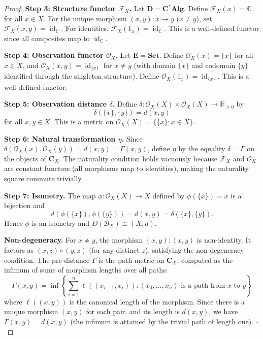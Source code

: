 \documentclass[11pt,a4paper]{article}
\begin{document}
\begin{proof}
\noindent\textbf{Step 3: Structure functor $\mathcal{F}_X$.}
Let $\mathbf{D}=\mathbf{C^*Alg}$. Define $\mathcal{F}_X(x)=\mathbb{C}$ for
all $x\in X$. For the unique morphism $(x,y):x\to y$ ($x\neq y$), set
$\mathcal{F}_X(x,y)=\operatorname{id}_{\mathbb{C}}$. For identities,
$\mathcal{F}_X(1_x)=\operatorname{id}_{\mathbb{C}}$. This is a well-defined
functor since all composites map to $\operatorname{id}_{\mathbb{C}}$.

\noindent\textbf{Step 4: Observation functor $\mathcal{O}_X$.}
Let $\mathbf{E}=\mathbf{Set}$. Define $\mathcal{O}_X(x)=\{x\}$ for all
$x\in X$, and $\mathcal{O}_X(x,y)=\operatorname{id}_{\{x\}}$ for $x\neq y$
(with domain $\{x\}$ and codomain $\{y\}$ identified through the singleton
structure). Define $\mathcal{O}_X(1_x)=\operatorname{id}_{\{x\}}$. This is
a well-defined functor.

\noindent\textbf{Step 5: Observation distance $\delta$.}
Define $\delta:\mathcal{O}_X(X)\times\mathcal{O}_X(X)\to\mathbb{R}_{\geq 0}$ by
\begin{equation}
\delta(\{x\},\{y\})=d(x,y)
\end{equation}
for all $x,y\in X$. This is a metric on $\mathcal{O}_X(X)=\{\{x\}:x\in X\}$.

\noindent\textbf{Step 6: Natural transformation $\eta$.}
Since $\delta(\mathcal{O}_X(x),\mathcal{O}_X(y))=d(x,y)=\Gamma(x,y)$,
define $\eta$ by the equality $\delta=\Gamma$ on the objects of
$\mathbf{C}_X$. The naturality condition holds vacuously because
$\mathcal{F}_X$ and $\mathcal{O}_X$ are constant functors (all morphisms
map to identities), making the naturality square commute trivially.

\noindent\textbf{Step 7: Isometry.}
The map $\phi:\mathcal{O}_X(X)\to X$ defined by $\phi(\{x\})=x$ is a
bijection and
\[
d(\phi(\{x\}),\phi(\{y\}))=d(x,y)=\delta(\{x\},\{y\}).
\]
Hence $\phi$ is an isometry and $D(\mathcal{B}_X)\cong(X,d)$.

\noindent\textbf{Non-degeneracy.}
For $x\neq y$, the morphism $(x,y):(x,y)$ is non-identity. It factors as
$(x,z)\circ(y,z)$ (for any distinct $z$), satisfying the non-degeneracy
condition. The pre-distance $\Gamma$ is the path metric on $\mathbf{C}_X$,
computed as the infimum of sums of morphism lengths over all paths:
\begin{equation}
\Gamma(x,y)=\inf\left\{\sum_{i=1}^n \ell((x_{i-1},x_i)) : (x_0,\dots,x_n)
\text{ is a path from }x\text{ to }y\right\}
\end{equation}
where $\ell((x,y))$ is the canonical length of the morphism. Since there
is a unique morphism $(x,y)$ for each pair, and its length is $d(x,y)$,
we have $\Gamma(x,y)=d(x,y)$ (the infimum is attained by the trivial
path of length one). $\square$
\end{proof}
\end{document}
